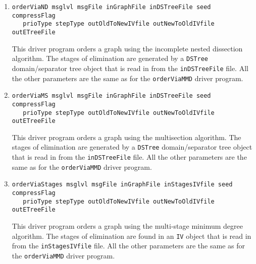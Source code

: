\begin{enumerate}
\begin{itemize}
\end{itemize}
\item
\begin{verbatim}
orderViaND msglvl msgFile inGraphFile inDSTreeFile seed compressFlag 
   prioType stepType outOldToNewIVfile outNewToOldIVfile outETreeFile 
\end{verbatim}
This driver program orders a graph using the incomplete nested 
dissection algorithm.
The stages of elimination are generated by a {\tt DSTree} 
domain/separator tree object that is read in from the
{\tt inDSTreeFile} file.
All the other parameters are the same as for the {\tt orderViaMMD}
driver program.
\item
\begin{verbatim}
orderViaMS msglvl msgFile inGraphFile inDSTreeFile seed compressFlag 
   prioType stepType outOldToNewIVfile outNewToOldIVfile outETreeFile 
\end{verbatim}
This driver program orders a graph using the multisection algorithm.
The stages of elimination are generated by a {\tt DSTree} 
domain/separator tree object that is read in from the
{\tt inDSTreeFile} file.
All the other parameters are the same as for the {\tt orderViaMMD}
driver program.
\item
\begin{verbatim}
orderViaStages msglvl msgFile inGraphFile inStagesIVfile seed compressFlag 
   prioType stepType outOldToNewIVfile outNewToOldIVfile outETreeFile 
\end{verbatim}
This driver program orders a graph using the multi-stage minimum
degree algorithm.
The stages of elimination are found in an {\tt IV} object that is
read in from the {\tt inStagesIVfile} file.
All the other parameters are the same as for the {\tt orderViaMMD}
driver program.
\end{enumerate}
